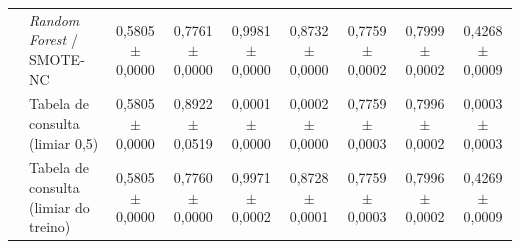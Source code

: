 \begin{table}[htb]
{\begin{tabular}{llccccccc}
     & \textit{Random Forest} / SMOTE-NC & 0,5805 $\pm$ 0,0000 & 0,7761 $\pm$ 0,0000 & 0,9981 $\pm$ 0,0000 & 0,8732 $\pm$ 0,0000 & 0,7759 $\pm$ 0,0002 & 0,7999 $\pm$ 0,0002 & 0,4268 $\pm$ 0,0009 \\
     & Tabela de consulta (limiar 0,5) & 0,5805 $\pm$ 0,0000 & 0,8922 $\pm$ 0,0519 & 0,0001 $\pm$ 0,0000 & 0,0002 $\pm$ 0,0000 & 0,7759 $\pm$ 0,0003 & 0,7996 $\pm$ 0,0002 & 0,0003 $\pm$ 0,0003 \\
     & Tabela de consulta (limiar do treino) & 0,5805 $\pm$ 0,0000 & 0,7760 $\pm$ 0,0000 & 0,9971 $\pm$ 0,0002 & 0,8728 $\pm$ 0,0001 & 0,7759 $\pm$ 0,0003 & 0,7996 $\pm$ 0,0002 & 0,4269 $\pm$ 0,0009 \\
    \hline
  \end{tabular}}
\end{table}

